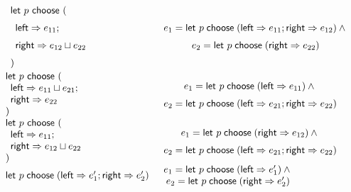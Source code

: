 \documentclass{lecturenotes}
\newcommand{\Left}{\textsf{left}\xspace}
\newcommand{\Right}{\textsf{right}\xspace}
\newcommand{\letchoose}[3]{\ensuremath{\textsf{let}~#1 \mathrel{\textsf{choose}} (\Left \Rightarrow #2; \Right \Rightarrow #3)}}
\newcommand{\letchooseL}[2]{\ensuremath{\textsf{let}~#1 \mathrel{\textsf{choose}} (\Left \Rightarrow #2)}}
\newcommand{\letchooseR}[2]{\ensuremath{\textsf{let}~#1 \mathrel{\textsf{choose}} (\Right \Rightarrow #2)}}
\begin{document}
$$\begin{array}{ll}
\begin{array}{l}
    \textsf{let}~p~\textsf{choose}~(\\
    \begin{array}[t]{l}
      \Left \Rightarrow e_{11};\\
      \Right \Rightarrow e_{12}  \sqcup e_{22}
    \end{array}\\
    )
  \end{array}
  & \begin{array}{c}e_1 = \letchoose{p}{e_{11}}{e_{12}} \land{}\\ e_2 = \letchooseR{p}{e_{22}}\end{array}
    \def\arraystretch{1.5}\\
  \def\arraystretch{1}
  \hspace{-0.5em}\begin{array}{l}
    \textsf{let}~p~\textsf{choose}~(\\
    \begin{array}[t]{l}
      \Left \Rightarrow e_{11} \sqcup e_{21};\\
      \Right \Rightarrow e_{22}
    \end{array}\\
    )
  \end{array}
  & \begin{array}{c}e_1 = \letchooseL{p}{e_{11}} \land{}\\ e_2 = \letchoose{p}{e_{21}}{e_{22}}\end{array}
    \def\arraystretch{1.5}\\
  \def\arraystretch{1}
  \hspace{-0.5em}\begin{array}{l}
    \textsf{let}~p~\textsf{choose}~(\\
    \begin{array}[t]{l}
      \Left \Rightarrow e_{11};\\
      \Right \Rightarrow e_{12} \sqcup e_{22}
    \end{array}\\
    )
  \end{array}
  & \begin{array}{c}e_1 = \letchooseR{p}{e_{12}} \land{}\\ e_2 = \letchoose{p}{e_{21}}{e_{22}}\end{array}
    \def\arraystretch{1.5}\\
  \letchoose{p}{e_1'}{e_2'} & \def\arraystretch{1}\begin{array}{c}e_1 = \letchooseL{p}{e_1'} \land{}\\ e_2 = \letchooseR{p}{e_2'}\end{array}\def\arraystretch{1.5}\\[1em]

\end{array}$$
\end{document}
